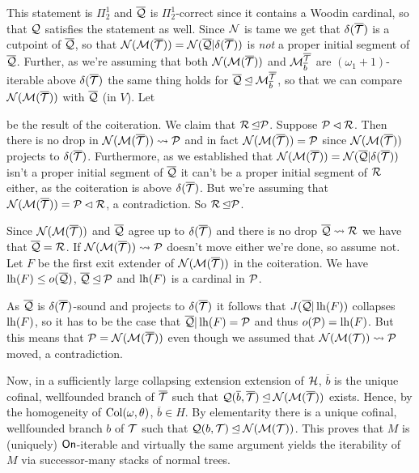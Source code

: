 \documentclass[../../main]{subfiles}
\begin{document}
{{    This statement is $\Pi^1_2$ and $\overline\Q$ is $\Pi^1_2$-correct since it contains a Woodin cardinal, so that $\Q$ satisfies the statement as well. Since $\N$ is tame we get that $\delta(\overline\T)$ is a cutpoint of $\overline\Q$, so that $\N(\M(\overline\T))=\N(\overline\Q|\delta(\overline\T))$ is \textit{not} a proper initial segment of $\overline\Q$. Further, as we're assuming that both $\N(\M(\overline\T))$ and $\M^{\overline\T}_{\overline b}$ are $(\omega_{1}{+}1)$-iterable above $\delta(\overline\T)$ the same thing holds for $\overline\Q\init\M_{\overline b}^{\overline\T}$, so that we can compare $\N(\M(\overline\T))$ with $\overline\Q$ (in $V$). Let
    \eq{ 
      (\N(\M(\overline\T)),\overline\Q) \leadsto (\P,\R) 
    }

    be the result of the coiteration. We claim that $\R\init\P$. Suppose $\P\pinit\R$. Then there is no drop in $\N(\M(\overline\T))\leadsto\P$ and in fact $\N(\M(\overline\T))=\P$ since $\N(\M(\overline\T))$ projects to $\delta(\overline\T)$. Furthermore, as we established that $\N(\M(\overline\T))=\N(\overline\Q|\delta(\overline\T))$ isn't a proper initial segment of $\overline\Q$ it can't be a proper initial segment of $\R$ either, as the coiteration is above $\delta(\overline\T)$. But we're assuming that $\N(\M(\overline\T))=\P\pinit\R$, a contradiction. So $\R\init\P$.
        
    \qquad Since $\N(\M(\overline\T))$ and $\overline\Q$ agree up to $\delta(\overline\T)$ and there is no drop $\overline\Q\leadsto\R$ we have that $\overline\Q=\R$. If $\N(\M(\overline\T))\leadsto\P$ doesn't move either we're done, so assume not. Let $F$ be the first exit extender of $\N(\M(\overline\T))$ in the coiteration. We have $\lh(F) \le o(\overline\Q)$, $\overline\Q\init\P$ and $\lh(F)$ is a cardinal in $\P$.
        
    \qquad As $\overline\Q$ is $\delta(\overline\T)$-sound and projects to $\delta(\overline\T)$ it follows that $J(\overline\Q|\lh(F))$ collapses $\lh(F)$, so it has to be the case that $\overline\Q|\lh(F)=\P$ and thus $o(\P)=\lh(F)$. But this means that $\P=\N(\M(\overline\T))$ even though we assumed that $\N(\M(\T))\leadsto\P$ moved, a contradiction.
  }

  Now, in a sufficiently large collapsing extension extension of $\h$, $\overline b$ is the unique cofinal, wellfounded branch of $\overline\T$ such that $\Q(\overline b,\overline\T) \init\N(\M(\overline\T))$ exists. Hence, by the homogeneity of $\col(\omega,\theta)$, $\overline b \in H$. By elementarity there is a unique cofinal, wellfounded branch $b$ of $\T$ such that $\Q(b,\T)\init\N(\M(\T))$. This proves that $M$ is (uniquely) $\on$-iterable and virtually the same argument yields the iterability of $M$ via successor-many stacks of normal trees.
  
}
\end{document}
